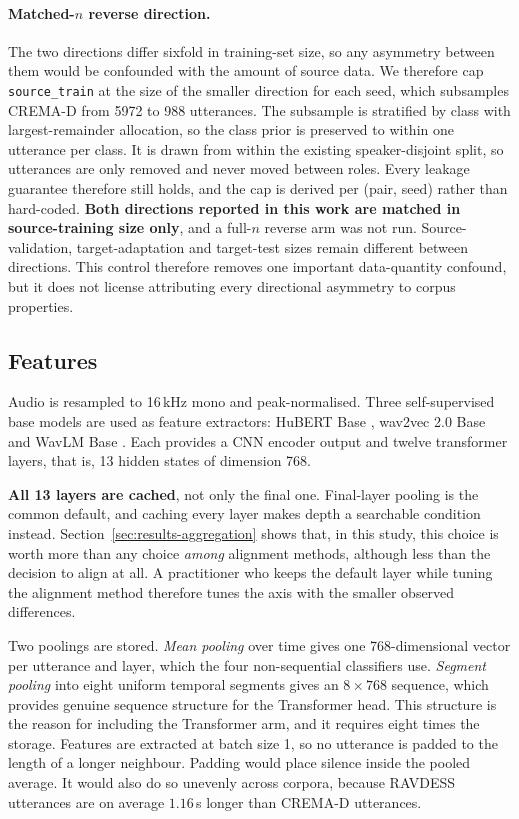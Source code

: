 \paragraph{Matched-$n$ reverse direction.} The two directions differ sixfold in
training-set size, so any asymmetry between them would be confounded with the
amount of source data. We therefore cap \texttt{source\_train} at the size of
the smaller direction for each seed, which subsamples CREMA-D from 5972 to 988
utterances. The subsample is stratified by class with largest-remainder
allocation, so the class prior is preserved to within one utterance per class.
It is drawn from within the existing speaker-disjoint split, so utterances are
only removed and never moved between roles. Every leakage guarantee therefore
still holds, and the cap is derived per (pair, seed) rather than hard-coded.
\textbf{Both directions reported in this work are matched in source-training
size only}, and a full-$n$ reverse arm was not run. Source-validation,
target-adaptation and target-test sizes remain different between directions.
This control therefore removes one important data-quantity confound, but it
does not license attributing every directional asymmetry to corpus properties.

\subsection{Features}
\label{sec:features}

Audio is resampled to 16\,kHz mono and peak-normalised. Three self-supervised
base models are used as feature extractors: HuBERT Base \cite{hsu2021hubert},
wav2vec 2.0 Base \cite{baevski2020wav2vec} and WavLM Base \cite{chen2022wavlm}.
Each provides a CNN encoder output and twelve transformer layers, that is,
13 hidden states of dimension 768.

\textbf{All 13 layers are cached}, not only the final one. Final-layer pooling
is the common default, and caching every layer makes depth a searchable
condition instead. Section~\ref{sec:results-aggregation} shows that, in this
study, this choice is worth more than any choice \emph{among} alignment
methods, although less than the decision to align at all. A practitioner who
keeps the default layer while tuning the alignment method therefore tunes the
axis with the smaller observed differences.

Two poolings are stored. \emph{Mean pooling} over time gives one
768-dimensional vector per utterance and layer, which the four non-sequential
classifiers use. \emph{Segment pooling} into eight uniform temporal segments
gives an $8 \times 768$ sequence, which provides genuine sequence structure for
the Transformer head. This structure is the reason for including the
Transformer arm, and it requires eight times the storage. Features are
extracted at batch size 1, so no utterance is padded to the length of a longer
neighbour. Padding would place silence inside the pooled average. It would also
do so unevenly across corpora, because RAVDESS utterances are on average
$1.16$\,s longer than CREMA-D utterances.

